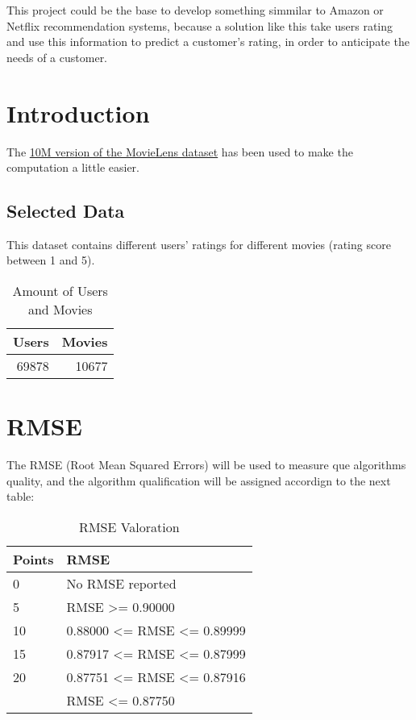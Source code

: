 \documentclass[]{article}
\begin{document}
This project could be the base to develop something simmilar to Amazon
or Netflix recommendation systems, because a solution like this take
users rating and use this information to predict a customer's rating, in
order to anticipate the needs of a customer.

\hypertarget{introduction}{%
\section{Introduction}\label{introduction}}

The \href{https://grouplens.org/datasets/movielens/10m/}{10M version of
the MovieLens dataset} has been used to make the computation a little
easier.

\hypertarget{selected-data}{%
\subsection{Selected Data}\label{selected-data}}

This dataset contains different users' ratings for different movies
(rating score between 1 and 5).

\begin{table}[!h]

\caption{\label{tab:edx.test.training.test}Amount of Users and Movies}
\centering
\begin{tabular}{rr}
\toprule
Users & Movies\\
\midrule
\rowcolor{gray!6}  69878 & 10677\\
\bottomrule
\end{tabular}
\end{table}

\pagebreak

\hypertarget{rmse}{%
\section{RMSE}\label{rmse}}

The RMSE (Root Mean Squared Errors) will be used to measure que
algorithms quality, and the algorithm qualification will be assigned
accordign to the next table:

\begin{table}[!h]

\caption{\label{tab:rmse.table}RMSE Valoration}
\centering
\begin{tabular}{ll}
\toprule
Points & RMSE\\
\midrule
\rowcolor{gray!6}  0 & No RMSE reported\\
5 & RMSE >= 0.90000\\
\rowcolor{gray!6}  10 & 0.88000 <= RMSE <= 0.89999\\
15 & 0.87917 <= RMSE <= 0.87999\\
\rowcolor{gray!6}  20 & 0.87751 <= RMSE <= 0.87916\\
\addlinespace
25 & RMSE <= 0.87750\\
\bottomrule
\end{tabular}
\end{table}
\end{document}

